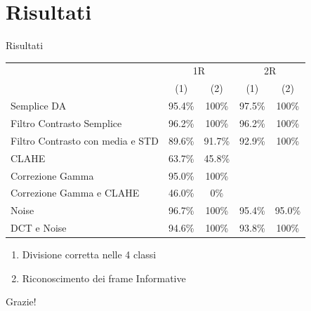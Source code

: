 \documentclass[aspectratio=169]{beamer}
\begin{document}
\section{Risultati}
\begin{frame}{Risultati}
    \begin{table}[H]
        \centering
        \begin{tabular}{l|cc|cc}
                                         & \multicolumn{2}{c|}{1R}                                                   & \multicolumn{2}{c}{2R}                                                   \\
                                         & (1) & (2) & (1) & (2) \\ \midrule
        Semplice DA                      & 95.4\%                            & 100\%                                & 97.5\%                            & 100\%                                \\
        Filtro Contrasto Semplice        & 96.2\%                            & 100\%                                & 96.2\%                            & 100\%                                \\
        Filtro Contrasto con media e STD & 89.6\%                            & 91.7\%                               & 92.9\%                            & 100\%                                \\
        CLAHE                            & 63.7\%                            & 45.8\%                               &                                   &                                      \\
        Correzione Gamma                 & 95.0\%                            & 100\%                                &                                   &                                      \\
        Correzione Gamma e CLAHE         & 46.0\%                            & 0\%                                  &                                   &                                      \\
        Noise                            & 96.7\%                            & 100\%                                & 95.4\%                            & 95.0\%                               \\
        DCT e Noise                      & 94.6\%                            & 100\%                                & 93.8\%                            & 100\%                             
        \end{tabular}
    \end{table}
    \begin{enumerate}
        \item Divisione corretta nelle 4 classi
        \item Riconoscimento dei frame Informative
    \end{enumerate}
\end{frame}
\begin{frame}[c]{ }
    \centering
    Grazie!
    \end{frame}
\end{document}
